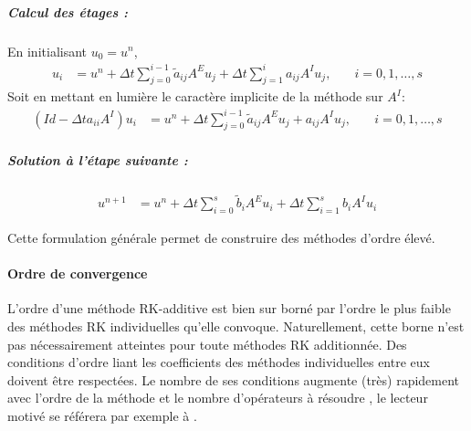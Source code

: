         \subparagraph{Calcul des étages :}
        En initialisant $u_0 = u^n$,
        \begin{align}
        u_i &= u^n + \Delta t \sum_{j=0}^{i-1} \tilde{a}_{ij} A^E u_j + \Delta t \sum_{j=1}^{i} a_{ij} A^I u_j, \quad &i = 0, 1, \ldots, s
        \end{align}
        Soit en mettant en lumière le caractère implicite de la méthode sur $A^I$:
        \begin{align}
        (Id - \Delta t a_{ii} A^I) u_i &= u^n + \Delta t \sum_{j=0}^{i-1} \tilde{a}_{ij} A^E u_j + a_{ij} A^I u_j, \quad &i= 0, 1, \ldots, s
        \end{align}
        
        \subparagraph{Solution à l'étape suivante :}
        \begin{align}
        u^{n+1} &= u^n + \Delta t \sum_{i=0}^{s} \tilde{b}_i A^E u_i + \Delta t \sum_{i=1}^{s} b_i A^I u_i
        \end{align}
        
        Cette formulation générale permet de construire des méthodes d'ordre élevé. 
    \paragraph{Ordre de convergence}
        L'ordre d'une méthode RK-additive est bien sur borné par l'ordre le plus faible des méthodes RK individuelles qu'elle convoque.
        Naturellement, cette borne n'est pas nécessairement atteintes pour toute méthodes RK additionnée. Des conditions d'ordre liant
        les coefficients des méthodes individuelles entre eux doivent être respectées. Le nombre de ses conditions augmente (très) rapidement avec 
        l'ordre de la méthode et le nombre d'opérateurs à résoudre \cite{KENNEDY2003139}, le lecteur motivé se référera par exemple à \cite{Hairer1981}.